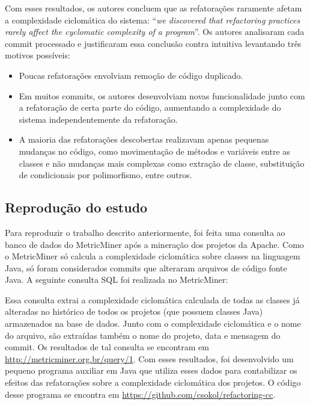 \documentclass[a4paper, 12pt, twoside]{book}
\begin{document}
        Com esses resultados, os autores concluem que as refatorações raramente afetam a complexidade ciclomática do sistema: ``\textit{we discovered that refactoring practices rarely affect the cyclomatic complexity of a program}''. Os autores analisaram cada commit processado e justificaram essa conclusão contra intuitiva levantando três motivos possíveis:

        \begin{itemize}
            \item Poucas refatorações envolviam remoção de código duplicado.
            \item Em muitos commits, os autores desenvolviam novas funcionalidade junto com a refatoração de certa parte do código, aumentando a complexidade do sistema independentemente da refatoração.
            \item A maioria das refatorações descobertas realizavam apenas pequenas mudanças no código, como movimentação de métodos e variáveis entre as classes e não mudanças mais complexas como extração de classe, substituição de condicionais por polimorfismo, entre outros.
        \end{itemize}


        \subsection*{Reprodução do estudo}
        Para reproduzir o trabalho descrito anteriormente, foi feita uma consulta ao banco de dados do MetricMiner após a mineração dos projetos da Apache. Como o MetricMiner só calcula a complexidade ciclomática sobre classes na linguagem Java, só foram considerados commits que alteraram arquivos de código fonte Java. A seguinte consulta SQL foi realizada no MetricMiner:

        

        Essa consulta extrai a complexidade ciclomática calculada de todas as classes já alteradas no histórico de todos os projetos (que possuem classes Java) armazenados na base de dados. Junto com o complexidade ciclomática e o nome do arquivo, são extraídas também o nome do projeto, data e mensagem do commit. Os resultados de tal consulta se encontram em \url{http://metricminer.org.br/query/1}. Com esses resultados, foi desenvolvido um pequeno programa auxiliar em Java que utiliza esses dados para contabilizar os efeitos das refatorações sobre a complexidade ciclomática dos projetos. O código desse programa se encontra em \url{https://github.com/csokol/refactoring-cc}.
\end{document}
